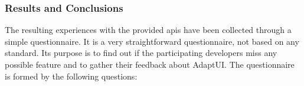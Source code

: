 % 
% 
% 
% 
% 
% 
% 


\subsubsection{Results and Conclusions}
\label{sec:api_results}

The resulting experiences with the provided \acp{api} have been collected through
a simple questionnaire. It is a very straightforward questionnaire, not based on
any standard. Its purpose is to find out if the participating developers miss 
any possible feature and to gather their feedback about AdaptUI. The 
questionnaire is formed by the following questions:

